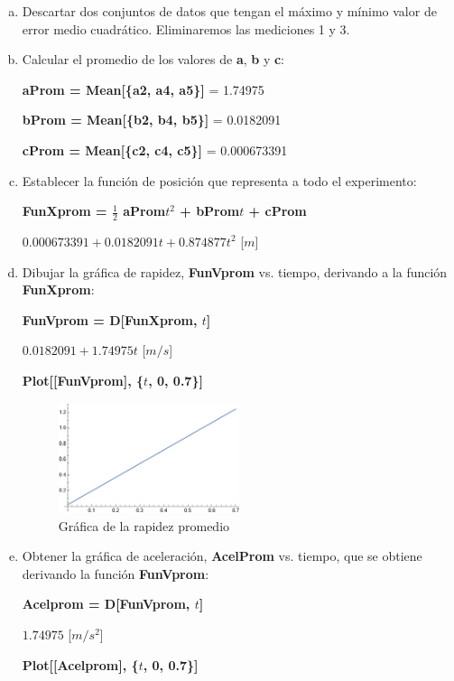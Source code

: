 \documentclass[12pt, titlepage]{report}
\begin{document}
    \begin{enumerate}[a), topsep=0.5cm, resume]
        \item Descartar dos conjuntos de datos que tengan el máximo y mínimo valor de error medio cuadrático. Eliminaremos las mediciones 1 y 3. 
        \item Calcular el promedio de los valores de \textbf{a}, \textbf{b} y \textbf{c}:
        
        \centerline{\textbf{aProm = Mean[\{a2, a4, a5\}]} = 1.74975}
        \centerline{\textbf{bProm = Mean[\{b2, b4, b5\}]} = 0.0182091}
        \centerline{\textbf{cProm = Mean[\{c2, c4, c5\}]} = 0.000673391}

        \item Establecer la función de posición que representa a todo el experimento:
        
        \centerline{\textbf{FunXprom =  $\frac{1}{2}$ aProm$t^2$ + bProm$t$ + cProm}}
        \centerline{$0.000673391 + 0.0182091 t + 0.874877 t^2$ [$m$]}

        \item Dibujar la gráfica de rapidez, \textbf{FunVprom} vs. tiempo, derivando a la función \textbf{FunXprom}:
        
        \centerline{\textbf{FunVprom = D[FunXprom, $t$]}}
        \centerline{$0.0182091 + 1.74975 t$ [$m/s$]}
        \centerline{\textbf{Plot[[FunVprom], \{$t$, 0, 0.7\}]}}

        \begin{figure}[ht]
            \centering
            \includegraphics[width=0.5\textwidth]{Graf_Rapidez.png}
            \caption{Gráfica de la rapidez promedio}
        \end{figure}

        \item Obtener la gráfica de aceleración, \textbf{AcelProm} vs. tiempo, que se obtiene derivando la función \textbf{FunVprom}:
        
        \centerline{\textbf{Acelprom = D[FunVprom, $t$]}}
        \centerline{$1.74975$ [$m/s^2$]}
        \centerline{\textbf{Plot[[Acelprom], \{$t$, 0, 0.7\}]}}


\end{enumerate}
\end{document}
